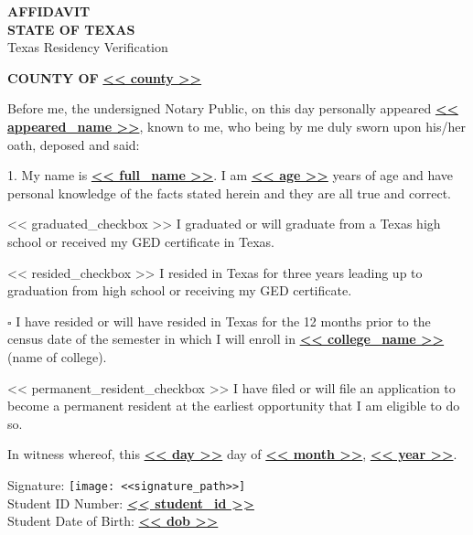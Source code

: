\documentclass[12pt]{article}
\begin{document}
\begin{center}
    {\Large \textbf{AFFIDAVIT}}\\
    \textbf{STATE OF TEXAS}\\
    \small Texas Residency Verification
\end{center}

\vspace{1em}

\noindent \textbf{COUNTY OF} \underline{\textbf{<< county >>}}

\vspace{1em}

Before me, the undersigned Notary Public, on this day personally appeared
\underline{\textbf{<< appeared_name >>}}, known to me, who being by me duly sworn upon his/her oath, deposed and said:

\vspace{1em}

1. My name is \underline{\textbf{<< full_name >>}}. I am \underline{\textbf{<< age >>}} years of age and have personal knowledge of the facts stated herein and they are all true and correct.

\vspace{1em}

<< graduated_checkbox >> I graduated or will graduate from a Texas high school or received my GED certificate in Texas.

\vspace{0.5em}
<< resided_checkbox >> I resided in Texas for three years leading up to graduation from high school or receiving my GED certificate.

\vspace{0.5em}
$\square$ I have resided or will have resided in Texas for the 12 months prior to the census date of the semester in which I will enroll in \underline{\textbf{<< college_name >>}} (name of college).

\vspace{0.5em}
<< permanent_resident_checkbox >> I have filed or will file an application to become a permanent resident at the earliest opportunity that I am eligible to do so.

\vspace{1em}

In witness whereof, this \underline{\textbf{<< day >>}} day of
\underline{\textbf{<< month >>}}, \underline{\textbf{<< year >>}}.

\vspace{1em}

Signature: \texttt{[image: <<signature\_path>>]}\\
Student ID Number: \underline{\textbf{<< student_id >>}} \\
Student Date of Birth: \underline{\textbf{<< dob >>}}
\end{document}
